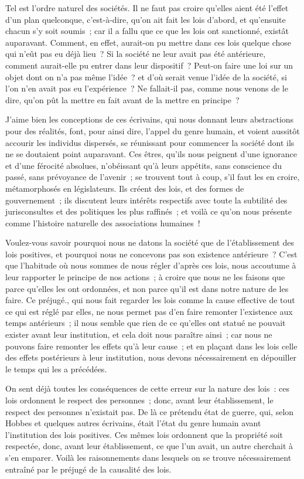 \documentclass[french,twoside]{book} %
\begin{document}
Tel est l’ordre naturel des sociétés. Il ne faut pas croire qu’elles aient été l’effet d’un plan quelconque, c’est-à-dire, qu’on ait fait les lois d’abord, et qu’ensuite chacun s’y soit soumis ; car il a fallu que ce que les lois ont sanctionné, existât auparavant. Comment, en effet, aurait-on pu mettre dans ces lois quelque chose qui n’eût pas eu déjà lieu ? Si la société ne leur avait pas été antérieure, comment aurait-elle pu entrer dans leur dispositif ? Peut-on faire une loi sur un objet dont on n’a pas même l’idée ? et d’où serait venue l’idée de la société, si l’on n’en avait pas eu l’expérience ? Ne fallait-il pas, comme nous venons de le dire, qu’on pût la mettre en fait avant de la mettre en principe ?\par
J’aime bien les conceptions de ces écrivains, qui nous donnant leurs abstractions pour des réalités, font, pour ainsi dire, l’appel du genre humain, et voient aussitôt accourir les individus dispersés, se réunissant pour commencer la société dont ils ne se doutaient point auparavant. Ces êtres, qu’ils nous peignent d’une ignorance et d’une férocité absolues, n’obéissant qu’à leurs appétits, sans conscience du passé, sans prévoyance de l’avenir ; se trouvent tout à coup, s’il faut les en croire, métamorphosés en législateurs. Ils créent des lois, et des formes de gouvernement ; ils discutent leurs intérêts respectifs avec toute la subtilité des jurisconsultes et des politiques les plus raffinés ; et voilà ce qu’on nous présente comme l’histoire naturelle des associations humaines !\par
Voulez-vous savoir pourquoi nous ne datons la société que de l’établissement des lois positives, et pourquoi nous ne concevons pas son existence antérieure ? C’est que l’habitude où nous sommes de nous régler d’après ces lois, nous accoutume à leur rapporter le principe de nos actions ; à croire que nous ne les faisons que parce qu’elles les ont ordonnées, et non parce qu’il est dans notre nature de les faire. Ce préjugé., qui nous fait regarder les lois comme la cause effective de tout ce qui est réglé par elles, ne nous permet pas d’en faire remonter l’existence aux temps antérieurs ; il nous semble que rien de ce qu’elles ont statué ne pouvait exister avant leur institution, et cela doit nous paraître ainsi ; car nous ne pouvons faire remonter les effets qu’à leur cause ; et en plaçant dans les lois celle des effets postérieurs à leur institution, nous devons nécessairement en dépouiller le temps qui les a précédées.\par
On sent déjà toutes les conséquences de cette erreur sur la nature des lois : ces lois ordonnent le respect des personnes ; donc, avant leur établissement, le respect des personnes n’existait pas. De là ce prétendu état de guerre, qui, selon Hobbes et quelques autres écrivains, était l’état du genre humain avant l’institution des lois positives. Ces mêmes lois ordonnent que la propriété soit respectée, donc, avant leur établissement, ce que l’un avait, un autre cherchait à s’en emparer. Voilà les raisonnements dans lesquels on se trouve nécessairement entraîné par le préjugé de la causalité des lois.\par
\end{document}
